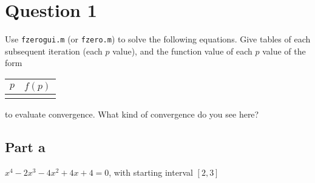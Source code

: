 \section{Question 1}

\begin{question}
    Use \verb+fzerogui.m+ (or \verb+fzero.m+) to solve the following equations. Give tables of each subsequent iteration (each $p$ value), and the function value of each $p$ value of the form 
    \begin{tabular}
        {c|c}
        $p$ & $f(p)$ \\\hline
        & 
    \end{tabular}
    to evaluate convergence. What kind of convergence do you see here? 
\end{question}

\subsection{Part a}

\begin{question}
    $x^4-2x^3-4x^2+4x+4=0$, with starting interval $[2,3]$
\end{question}

